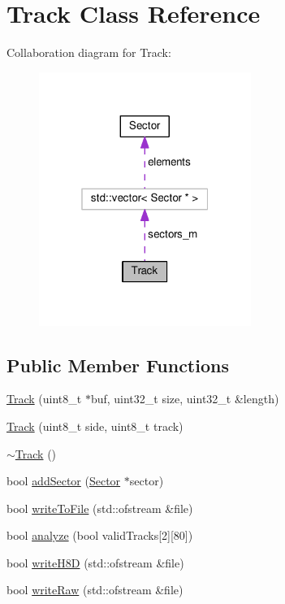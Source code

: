 \hypertarget{classTrack}{}\section{Track Class Reference}
\label{classTrack}


Collaboration diagram for Track\+:\nopagebreak
\begin{figure}[H]
\begin{center}
\leavevmode
\includegraphics[width=196pt]{classTrack__coll__graph}
\end{center}
\end{figure}
\subsection*{Public Member Functions}
\begin{DoxyCompactItemize}
\item 
\hyperlink{classTrack_a62eb2440ac055145ef72e27c5d2682b9}{Track} (uint8\+\_\+t $\ast$buf, uint32\+\_\+t size, uint32\+\_\+t \&length)
\item 
\hyperlink{classTrack_a15b3b2cda8f475ce63246c54c2b1d1e3}{Track} (uint8\+\_\+t side, uint8\+\_\+t track)
\item 
\hyperlink{classTrack_a416e75e66accc8eb9e3fafc3e8555216}{$\sim$\+Track} ()
\item 
bool \hyperlink{classTrack_a3020851356d50989d19e0d1289dad1c6}{add\+Sector} (\hyperlink{classSector}{Sector} $\ast$sector)
\item 
bool \hyperlink{classTrack_a8286a129153c40587bdf984e5f25cb87}{write\+To\+File} (std\+::ofstream \&file)
\item 
bool \hyperlink{classTrack_a043395f2b113c1d9c2c3ba413d51b470}{analyze} (bool valid\+Tracks\mbox{[}2\mbox{]}\mbox{[}80\mbox{]})
\item 
bool \hyperlink{classTrack_a9d6893017cc8f7e438fe5ab6b8fd86b2}{write\+H8\+D} (std\+::ofstream \&file)
\item 
bool \hyperlink{classTrack_ae412c34ba23acafdc10fa80dc0f77b60}{write\+Raw} (std\+::ofstream \&file)
\end{DoxyCompactItemize}

